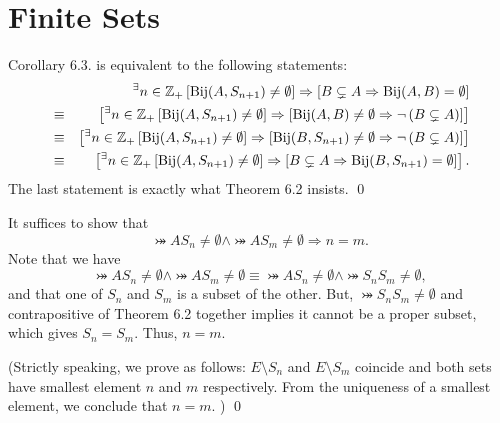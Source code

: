 \documentclass[a4paper,12pt]{article}
\begin{document}
\section{Finite Sets}
\setcounter{exe}{0}

\begin{rem}
	Corollary 6.3. is equivalent to the following statements:
	\begin{eqnarray*}
		&&
		{}^{\exists} n \in \mathbb{Z}_{+}
		\left[ \mathrm{Bij}(A,S_{n+1}) \neq \emptyset \right]
		\Rightarrow
		\left[
			B \subsetneq A
			\Rightarrow
			\mathrm{Bij}(A,B) = \emptyset
			\right]\\
		&\equiv&
		\left[
			{}^{\exists} n \in \mathbb{Z}_{+}
			\left[ \mathrm{Bij}(A,S_{n+1}) \neq \emptyset \right]
			\Rightarrow
			\left[
				\mathrm{Bij}(A,B) \neq \emptyset
				\Rightarrow
				\neg \left( B \subsetneq A \right)
				\right]
			\right]\\
		&\equiv&
		\left[
			{}^{\exists} n \in \mathbb{Z}_{+}
			\left[ \mathrm{Bij}(A,S_{n+1}) \neq \emptyset \right]
			\Rightarrow
			\left[
				\mathrm{Bij}(B,S_{n+1}) \neq \emptyset
				\Rightarrow
				\neg \left( B \subsetneq A \right)
				\right]
			\right]\\
		&\equiv&
		\left[
			{}^{\exists} n \in \mathbb{Z}_{+}
			\left[ \mathrm{Bij}(A,S_{n+1}) \neq \emptyset \right]
			\Rightarrow
			\left[
				B \subsetneq A
				\Rightarrow
				\mathrm{Bij}(B,S_{n+1}) = \emptyset
				\right]
			\right].
	\end{eqnarray*}
	The last statement is exactly what Theorem 6.2 insists.
	\qed\end{rem}

\begin{rem}
	It suffices to show that
	\begin{equation*}
		\bij{A}{S_n} \neq \emptyset \wedge \bij{A}{S_m}\neq \emptyset
		\Rightarrow
		n=m.
	\end{equation*}
	Note that we have
	\begin{equation*}
		\bij{A}{S_n}\neq \emptyset \wedge \bij{A}{S_m}\neq \emptyset
		\equiv
		\bij{A}{S_n} \neq \emptyset \wedge \bij{S_n}{S_m}\neq \emptyset,
	\end{equation*}
	and that one of \( S_n \) and \( S_m \) is a subset of the other.
	But, \( \bij{S_n}{S_m}\neq \emptyset \) and contrapositive of Theorem 6.2 together implies it cannot be a proper subset,
	which gives
	\( S_n =S_m \).
	Thus, \( n=m \).
	
	(Strictly speaking, we prove
	as follows:
	\( E \setminus S_n \) and \( E \setminus S_m \)
	coincide and both sets have smallest element \( n \) and \( m \) respectively.
	From the uniqueness of a smallest element,
	we conclude that \( n=m \). )
	\qed\end{rem}
\end{document}
